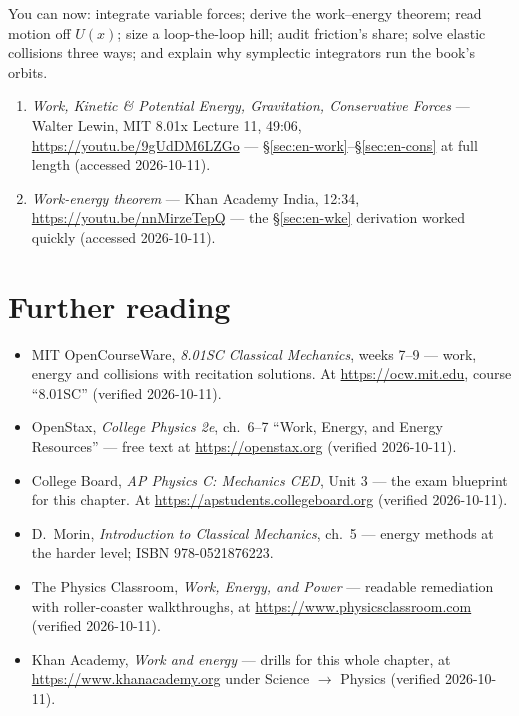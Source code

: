 \begin{wins}
You can now: integrate variable forces; derive the work--energy theorem;
read motion off $U(x)$; size a loop-the-loop hill; audit friction's share;
solve elastic collisions three ways; and explain why symplectic
integrators run the book's orbits.
\end{wins}


\begin{rulebox}
\begin{enumerate}
\item \emph{Work, Kinetic \& Potential Energy, Gravitation, Conservative
Forces} --- Walter Lewin, MIT 8.01x Lecture 11, 49:06,
\url{https://youtu.be/9gUdDM6LZGo} --- \S\ref{sec:en-work}--\S\ref{sec:en-cons}
at full length (accessed 2026-10-11).
\item \emph{Work-energy theorem} --- Khan Academy India, 12:34,
\url{https://youtu.be/nnMirzeTepQ} --- the §\ref{sec:en-wke} derivation
worked quickly (accessed 2026-10-11).
\end{enumerate}
\end{rulebox}

\section*{Further reading}

\begin{itemize}
\item MIT OpenCourseWare, \emph{8.01SC Classical Mechanics}, weeks 7--9 ---
work, energy and collisions with recitation solutions. At
\url{https://ocw.mit.edu}, course ``8.01SC'' (verified 2026-10-11).
\item OpenStax, \emph{College Physics 2e}, ch.~6--7 ``Work, Energy, and
Energy Resources'' --- free text at \url{https://openstax.org} (verified
2026-10-11).
\item College Board, \emph{AP Physics C: Mechanics CED}, Unit 3 --- the
exam blueprint for this chapter. At
\url{https://apstudents.collegeboard.org} (verified 2026-10-11).
\item D.~Morin, \emph{Introduction to Classical Mechanics}, ch.~5 ---
energy methods at the harder level; ISBN 978-0521876223.
\item The Physics Classroom, \emph{Work, Energy, and Power} --- readable
remediation with roller-coaster walkthroughs, at
\url{https://www.physicsclassroom.com} (verified 2026-10-11).
\item Khan Academy, \emph{Work and energy} --- drills for this whole
chapter, at \url{https://www.khanacademy.org} under Science $\to$ Physics
(verified 2026-10-11).
\end{itemize}

